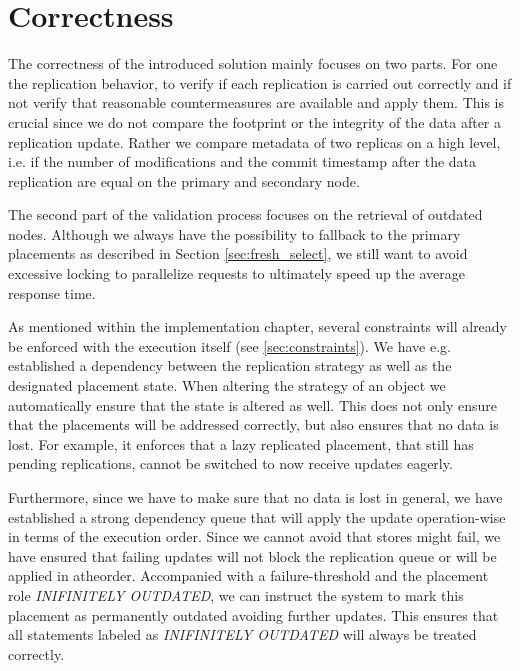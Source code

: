 
\section{Correctness}
\label{sec:correctness}


The correctness of the introduced solution mainly focuses on two parts. For one the replication behavior, to verify if each replication is carried out correctly
and if not verify that reasonable countermeasures are available and apply them. This is crucial since we do not compare the footprint or the integrity of the data after 
a replication update. Rather we compare metadata of two replicas on a high level,
i.e. if the number of modifications and the commit timestamp after the data replication are equal on the primary and secondary node. 

The second part of the validation process focuses on the retrieval of outdated nodes. Although we always have the possibility to fallback to the primary placements as described in 
Section \ref{sec:fresh_select}, we still want to avoid excessive locking to parallelize requests to ultimately speed up the average response time.

As mentioned within the implementation chapter, several constraints will already be enforced with the execution itself (see \ref{sec:constraints}). 
We have e.g. established a dependency between the replication strategy as well as the designated placement state. When altering the strategy of an object we
automatically ensure that the state is altered as well. This does not only ensure that the placements will be addressed correctly, but also ensures that no data is lost.
For example, it enforces that a lazy replicated placement, that still has pending replications, cannot be switched to now receive updates eagerly.

Furthermore, since we have to make sure that no data is lost in general, we have established a strong dependency queue that will apply the update operation-wise in terms of the execution order.
Since we cannot avoid that stores might fail, we have ensured that failing updates will not block the replication queue or will be applied in atheorder.
Accompanied with a failure-threshold and the placement role \emph{INIFINITELY OUTDATED}, we can instruct the system to mark this placement as permanently outdated 
avoiding further updates. 
This ensures that all statements labeled as \emph{INIFINITELY OUTDATED} will always be treated correctly.

